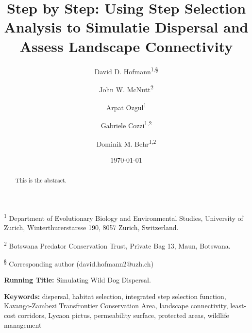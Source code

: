 \documentclass[abstract=on,10pt,a4paper,bibliography=totocnumbered]{article}
\title{Step by Step: Using Step Selection Analysis to Simulatie Dispersal and
Assess Landscape Connectivity}
\author{
  David D. Hofmann\textsuperscript{1,\S} \and
  John W. McNutt\textsuperscript{2} \and
  Arpat Ozgul\textsuperscript{1} \and
  Gabriele Cozzi\textsuperscript{1,2} \and
  Dominik M. Behr\textsuperscript{1,2}
}
\date{\today}
\begin{document}



\maketitle

\begin{flushleft}

\vspace{0.5cm}

\textsuperscript{1} Department of Evolutionary Biology and Environmental
Studies, University of Zurich, Winterthurerstarsse 190, 8057 Zurich,
Switzerland.

\textsuperscript{2} Botswana Predator Conservation Trust, Private Bag 13, Maun,
Botswana.

\textsuperscript{\S} Corresponding author (david.hofmann2@uzh.ch)

\vspace{4cm}

\textbf{Running Title:} Simulating Wild Dog Dispersal.

\vspace{0.5cm}

\textbf{Keywords:} dispersal, habitat selection, integrated step selection
function, Kavango-Zambezi Transfrontier Conservation Area, landscape
connectivity, least-cost corridors, Lycaon pictus, permeability surface,
protected areas, wildlife management

\end{flushleft}

\newpage
\begin{abstract}
This is the abstract.
\end{abstract}

\newpage


\end{document}
